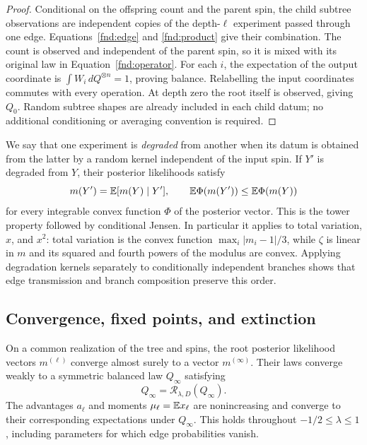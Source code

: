\begin{proof}
Conditional on the offspring count and the parent spin, the child
subtree observations are independent copies of the depth-\(\ell\)
experiment passed through one edge.  Equations~\eqref{fnd:edge} and
\eqref{fnd:product} give their combination.  The count is observed and
independent of the parent spin, so it is mixed with its original law
in Equation~\eqref{fnd:operator}.  For each \(i\), the expectation of
the output coordinate is \(\int W_i\,dQ^{\otimes n}=1\), proving
balance.  Relabelling the input coordinates commutes with every
operation.  At depth zero the root itself is observed, giving \(Q_0\).
Random subtree shapes are already included in each child datum; no
additional conditioning or averaging convention is required.
\end{proof}

We say that one experiment is \emph{degraded} from another when its
datum is obtained from the latter by a random kernel independent of
the input spin.  If \(Y'\) is degraded from \(Y\), their posterior
likelihoods satisfy
\begin{equation}\label{fnd:conditional-jensen}
 m(Y')=\mathbb E[m(Y)\mid Y'],\qquad
 \mathbb E\Phi(m(Y'))\leq\mathbb E\Phi(m(Y))
\end{equation}
for every integrable convex function \(\Phi\) of the posterior vector.
This is the tower property followed by conditional Jensen.  In
particular it applies to total variation, \(x\), and \(x^2\): total
variation is the convex function \(\max_i|m_i-1|/3\), while
\(\zeta\) is linear in \(m\) and its squared and fourth powers of
the modulus are convex.  Applying degradation
kernels separately to conditionally independent branches shows that
edge transmission and branch composition preserve this order.

\subsection{Convergence, fixed points, and extinction}

\begin{proposition}\label{fnd:limit}
On a common realization of the tree and spins, the root posterior
likelihood vectors \(m^{(\ell)}\) converge almost surely to a vector
\(m^{(\infty)}\).  Their laws converge weakly to a symmetric balanced
law \(Q_\infty\) satisfying
\begin{equation}\label{fnd:fixed-point}
 Q_\infty=\mathcal R_{\lambda,D}(Q_\infty).
\end{equation}
The advantages \(a_\ell\) and moments \(\mu_\ell=\mathbb E x_\ell\) are
nonincreasing and converge to their corresponding expectations under
\(Q_\infty\).  This holds throughout \(-1/2\leq\lambda\leq1\),
including parameters for which edge probabilities vanish.
\end{proposition}

